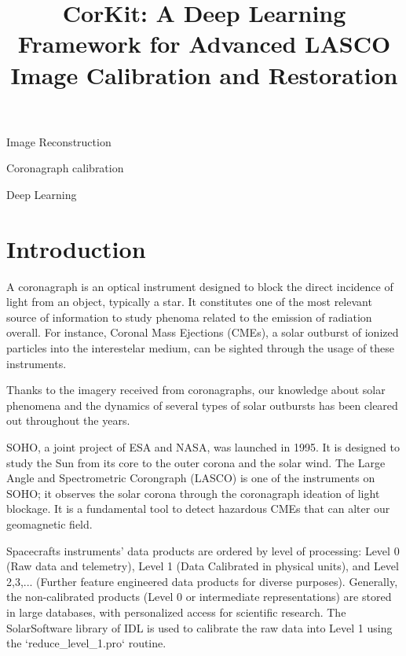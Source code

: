 \documentclass[draft]{agujournal2019}
\begin{document}
\title{CorKit: A Deep Learning Framework for Advanced LASCO Image Calibration and Restoration}


\begin{keypoints}
\item Image Reconstruction
\item Coronagraph calibration
\item Deep Learning
\end{keypoints}

\begin{abstract}
\end{abstract}

\section{Introduction}

A coronagraph is an optical instrument designed to block the direct incidence of light from an object, typically a star. It constitutes one of the most relevant source of information to study phenoma related to the emission of radiation overall. For instance, Coronal Mass Ejections (CMEs), a solar outburst of ionized particles into the interestelar medium, can be sighted through the usage of these instruments.

Thanks to the imagery received from coronagraphs, our knowledge about solar phenomena and the dynamics of several types of solar outbursts has been cleared out throughout the years.

SOHO, a joint project of ESA and NASA, was launched in 1995. It is designed to study the Sun from its core to the outer corona and the solar wind. The Large Angle and Spectrometric Corongraph (LASCO) is one of the instruments on SOHO; it observes the solar corona through the coronagraph ideation of light blockage. It is a fundamental tool to detect hazardous CMEs that can alter our geomagnetic field.

Spacecrafts instruments' data products are ordered by level of processing: Level 0 (Raw data and telemetry), Level 1 (Data Calibrated in physical units), and Level 2,3,... (Further feature engineered data products for diverse purposes). Generally, the non-calibrated products (Level 0 or intermediate representations) are stored in large databases, with personalized access for scientific research. The SolarSoftware library of IDL is used to calibrate the raw data into Level 1 using the `reduce_level_1.pro` routine.
\end{document}
